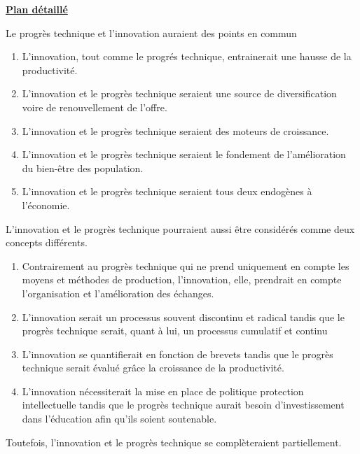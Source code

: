\begin{center}
	{\bfseries \underline{Plan détaillé}}	
\end{center}
\begin{enumerate}[label=\Alph*.]
	{\bfseries \item {Le progrès technique et l'innovation auraient des points en commun}}
	\begin{enumerate}[label=\theenumi\arabic* -]
		\item {L'innovation, tout comme le progrés technique, entrainerait une hausse de la productivité.}
		\item {L'innovation et le progrès technique seraient une source de diversification voire de renouvellement de l'offre.}  
		\item {L'innovation et le progrès technique seraient des moteurs de croissance.} 
		\item {L'innovation et le progrès technique seraient le fondement de l'amélioration du bien-être des population.} 
		\item {L'innovation et le progrès technique seraient tous deux endogènes à l'économie.}
	\end{enumerate}
	{\bfseries \item {L'innovation et le progrès technique pourraient aussi être considérés comme deux concepts différents.}}
	\begin{enumerate}[label=\theenumi\arabic* -]
		\item {Contrairement au progrès technique qui ne prend uniquement en compte les moyens et méthodes de production, l'innovation, elle, prendrait en compte l'organisation et l'amélioration des échanges.}
		\item {L'innovation serait un processus souvent discontinu et radical tandis que le progrès technique serait, quant à lui, un processus cumulatif et continu}
		\item {L'innovation se quantifierait en fonction de brevets tandis que le progrès technique serait évalué grâce la croissance de la productivité.}
		\item {L'innovation nécessiterait la mise en place de politique protection intellectuelle tandis que le progrès technique aurait besoin d'investissement dans l'éducation afin qu'ils soient soutenable.}  
	\end{enumerate}
	{\bfseries \item {Toutefois, l'innovation et le progrès technique se complèteraient partiellement.}}

\end{enumerate}
